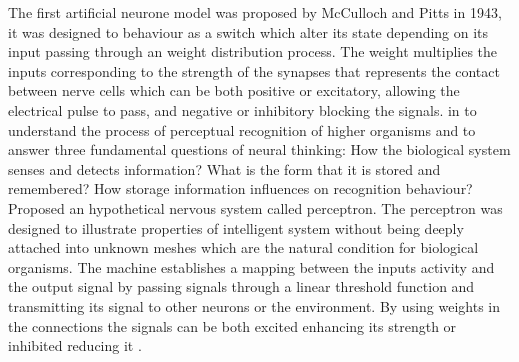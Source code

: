 The first artificial neurone model was proposed by McCulloch and Pitts in 1943, it was designed to behaviour as a switch which alter its state depending on its input passing through an weight distribution process. The weight multiplies the inputs corresponding to the strength of the synapses that represents the contact between nerve cells \cite{mcculloch1943logical} which can be both positive or excitatory, allowing the electrical pulse to pass, and negative or inhibitory blocking the signals. in \citeyear{rosenblatt1958perceptron} \citeauthor{rosenblatt1958perceptron} to understand the process of perceptual recognition of higher organisms and to answer three fundamental questions of neural thinking: How the biological system senses and detects information? What is the form that it is stored and remembered? How storage information influences on recognition behaviour? Proposed an hypothetical nervous system called perceptron. The perceptron was designed to illustrate properties of intelligent system without being deeply attached into unknown meshes which are the natural condition for biological organisms. The machine establishes a mapping between the inputs activity and the output signal by passing signals through a linear threshold function and transmitting its signal to other neurons or the environment. By using weights in the connections the signals can be both excited enhancing its strength or inhibited reducing it \cite{basheer2000artificial}. 



